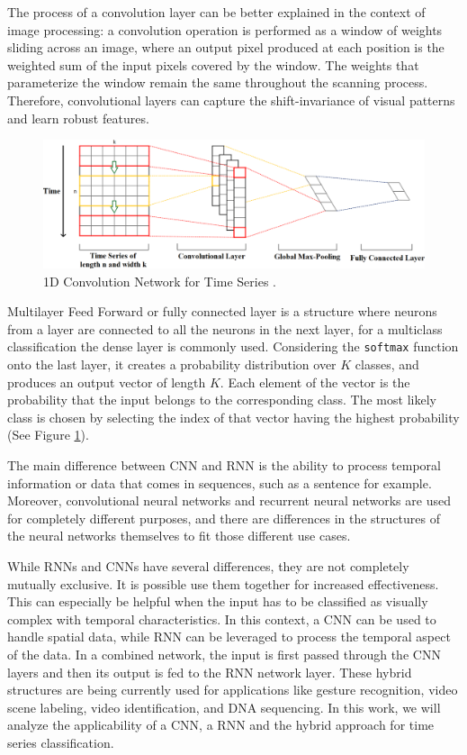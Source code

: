 The process of a convolution layer can be better explained in the context of image processing: a convolution operation is performed as a window of weights sliding across an image, where an output pixel produced at each position is the weighted sum of the input pixels covered by the window. The weights that parameterize the window remain the same throughout the scanning process. Therefore, convolutional layers can capture the shift-invariance of visual patterns and learn robust features.

\begin{figure}[htb]
	\centering
	\includegraphics[scale=0.25]{../Figures/1d-cnn}
	\caption{1D Convolution Network for Time Series \cite{Kim2014}.}
	\label{Fig:1DCNN}
\end{figure}

Multilayer Feed Forward or fully connected layer is a structure where neurons from a layer are connected to all the neurons in the next layer, for a multiclass classification the dense layer is commonly used. Considering the \texttt{softmax} function onto the last layer, it creates a probability distribution over $K$ classes, and produces an output vector of length $K$. Each element of the vector is the probability that the input belongs to the corresponding class. The most likely class is chosen by selecting the index of that vector having the highest probability (See Figure \ref{Fig:1DCNN}).

The main difference between CNN and RNN is the ability to process temporal information or data that comes in sequences, such as a sentence for example. Moreover, convolutional neural networks and recurrent neural networks are used for completely different purposes, and there are differences in the structures of the neural networks themselves to fit those different use cases. 

While RNNs and CNNs have several differences, they are not completely mutually exclusive. It is possible use them together for increased effectiveness. This can especially be helpful when the input has to be classified as visually complex with temporal characteristics. In this context, a CNN can be used to handle spatial data, while RNN can be leveraged to process the temporal aspect of the data. In a combined network, the input is first passed through the CNN layers and then its output is fed to the RNN network layer. These hybrid structures are being currently used for applications like gesture recognition, video scene labeling, video identification, and DNA sequencing. In this work, we will analyze the applicability of a CNN, a RNN and the hybrid approach for time series classification.

